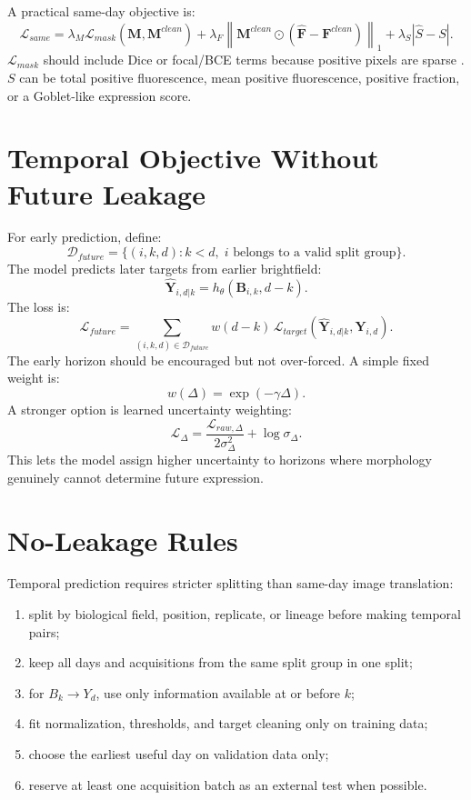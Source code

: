 \documentclass[11pt]{article}
\newcommand{\B}{\mathbf{B}}
\newcommand{\F}{\mathbf{F}}
\newcommand{\M}{\mathbf{M}}
\newcommand{\Y}{\mathbf{Y}}
\begin{document}
A practical same-day objective is:
\[
\mathcal{L}_{same}
=
\lambda_M\mathcal{L}_{mask}(\hat{\M}, \M^{clean})
+\lambda_F\left\|\M^{clean}\odot(\hat{\F}-\F^{clean})\right\|_1
+\lambda_S\left|\hat{S}-S\right|.
\]
\(\mathcal{L}_{mask}\) should include Dice or focal/BCE terms because positive pixels are sparse \cite{lin2017}. \(S\) can be total positive fluorescence, mean positive fluorescence, positive fraction, or a Goblet-like expression score.

\section{Temporal Objective Without Future Leakage}
For early prediction, define:
\[
\mathcal{D}_{future}=\{(i,k,d): k<d,\; i \text{ belongs to a valid split group}\}.
\]
The model predicts later targets from earlier brightfield:
\[
\hat{\Y}_{i,d|k}=h_{\theta}(\B_{i,k}, d-k).
\]
The loss is:
\[
\mathcal{L}_{future}
=
\sum_{(i,k,d)\in\mathcal{D}_{future}}
w(d-k)\,
\mathcal{L}_{target}(\hat{\Y}_{i,d|k},\Y_{i,d}).
\]
The early horizon should be encouraged but not over-forced. A simple fixed weight is:
\[
w(\Delta)=\exp(-\gamma \Delta).
\]
A stronger option is learned uncertainty weighting:
\[
\mathcal{L}_{\Delta}
=
\frac{\mathcal{L}_{raw,\Delta}}{2\sigma_\Delta^2}
+\log\sigma_\Delta.
\]
This lets the model assign higher uncertainty to horizons where morphology genuinely cannot determine future expression.

\section{No-Leakage Rules}
Temporal prediction requires stricter splitting than same-day image translation:
\begin{enumerate}[leftmargin=1.5em]
  \item split by biological field, position, replicate, or lineage before making temporal pairs;
  \item keep all days and acquisitions from the same split group in one split;
  \item for \(B_k \rightarrow Y_d\), use only information available at or before \(k\);
  \item fit normalization, thresholds, and target cleaning only on training data;
  \item choose the earliest useful day on validation data only;
  \item reserve at least one acquisition batch as an external test when possible.
\end{enumerate}
\end{document}
